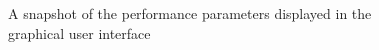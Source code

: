 \begin{figure}
	\centering
	\caption{A snapshot of the performance parameters displayed in the graphical user interface}
	\label{interface}
\end{figure}

